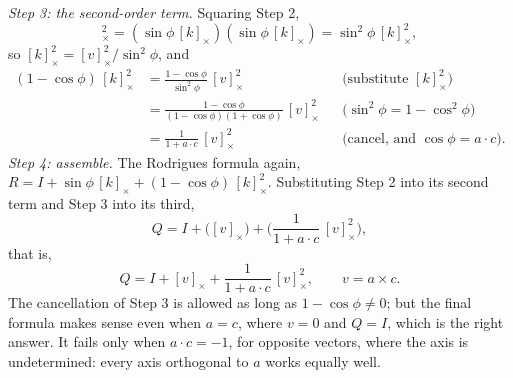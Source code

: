 \emph{Step 3: the second-order term.} Squaring Step 2,
\begin{equation*}
[v]_\times^2 = (\sin\phi\,[k]_\times)(\sin\phi\,[k]_\times) = \sin^2 \phi\, [k]_\times^2 ,
\end{equation*} so $[k]_\times^2 = [v]_\times^2/\sin^2\phi$, and
\begin{align*}
(1 - \cos\phi)\, [k]_\times^2 &= \frac{1 - \cos\phi}{\sin^2\phi}\, [v]_\times^2 && \text{(substitute } [k]_\times^2\text{)} \\
&= \frac{1 - \cos\phi}{(1 - \cos\phi)(1 + \cos\phi)}\, [v]_\times^2 && \text{(} \sin^2\phi = 1 - \cos^2\phi \text{)} \\
&= \frac{1}{1 + a\cdot c}\, [v]_\times^2 && \text{(cancel, and } \cos\phi = a\cdot c\text{)}.
\end{align*}
\emph{Step 4: assemble.} The Rodrigues formula again, $R = I + \sin \phi\, [k]_\times + (1 - \cos \phi)\, [k]_\times^2$. Substituting Step 2 into its second term and Step 3 into its third,
\begin{equation*}
Q = I + \big( [v]_\times \big) + \Big( \frac{1}{1 + a\cdot c}\, [v]_\times^2 \Big),
\end{equation*}
that is,
\begin{equation}
\label{eqn:rodrigues}
Q = I + [v]_\times + \frac{1}{1 + a \cdot c}\, [v]_\times^2 , \qquad v = a \times c .
\end{equation}
The cancellation of Step 3 is allowed as long as $1 - \cos\phi \neq 0$; but the final formula makes sense even when $a = c$, where $v = 0$ and $Q = I$, which is the right answer. It fails only when $a\cdot c = -1$, for opposite vectors, where the axis is undetermined: every axis orthogonal to $a$ works equally well.

